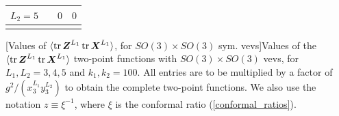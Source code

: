 {\begin{landscape}
\begin{tabular}{ !{\vrule width 1.5pt}c!{\vrule width 1.5pt}c!{\vrule width 1.5pt}c!{\vrule width 1.5pt}c!{\vrule width 1.5pt} }
		 	$L_2 = 5$ &  & $0$ & $0$ \\
		 	\hline
		\end{tabular}
		[Values of $\langle \tr \boldsymbol{Z}^{L_1} \tr \boldsymbol{X}^{L_1} \rangle$, for $SO(3) \times SO(3)$ sym. vevs]{Values of the $\langle \tr \boldsymbol{Z}^{L_1} \tr \boldsymbol{X}^{L_1} \rangle$ two-point functions with $SO(3) \times SO(3)$ vevs, for $L_1,L_2 = 3,4,5$ and $k_1,k_2 = 100$. All entries are to be multiplied by a factor of $g^2 / (x_3^{L_1} y_3^{L_2})$ to obtain the complete two-point functions. We also use the notation $z \equiv \xi^{-1}$, where $\xi$ is the conformal ratio (\ref{conformal_ratios}).}
		\vspace*{\fill}
    \end{landscape}
    \clearpage%
}

\pagebreak[4]
\restoregeometry
